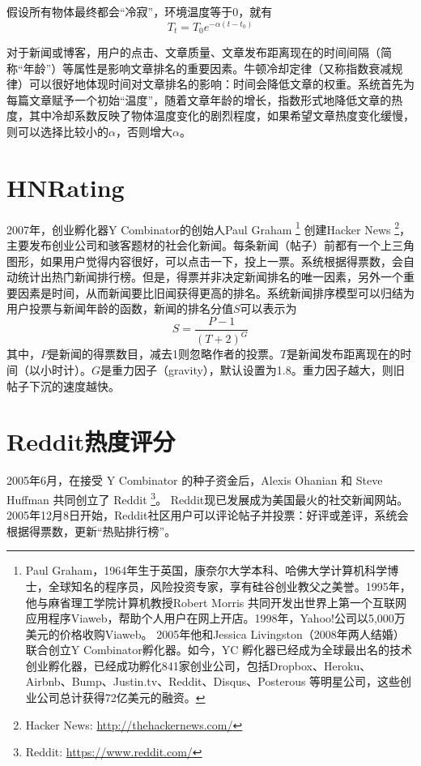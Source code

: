 假设所有物体最终都会“冷寂”，环境温度等于0，就有
\begin{equation}
    T_t = T_0 e^{-\alpha(t-t_0)}
\end{equation}

对于新闻或博客，用户的点击、文章质量、文章发布距离现在的时间间隔（简称“年龄”）等属性是影响文章排名的重要因素。牛顿冷却定律（又称指数衰减规律）可以很好地体现时间对文章排名的影响：时间会降低文章的权重。系统首先为每篇文章赋予一个初始“温度”，随着文章年龄的增长，指数形式地降低文章的热度，其中冷却系数反映了物体温度变化的剧烈程度，如果希望文章热度变化缓慢，则可以选择比较小的$\alpha$，否则增大$\alpha$。

\section{HNRating}
2007年，创业孵化器Y Combinator的创始人Paul Graham
\footnote{Paul Graham，1964年生于英国，康奈尔大学本科、哈佛大学计算机科学博士，全球知名的程序员，风险投资专家，享有硅谷创业教父之美誉。1995年，他与麻省理工学院计算机教授Robert Morris 共同开发出世界上第一个互联网应用程序Viaweb，帮助个人用户在网上开店。1998年，Yahoo!公司以5,000万美元的价格收购Viaweb。
2005年他和Jessica Livingston（2008年两人结婚）联合创立Y Combinator孵化器。如今，YC 孵化器已经成为全球最出名的技术创业孵化器，已经成功孵化841家创业公司，包括Dropbox、Heroku、Airbnb、Bump、Justin.tv、Reddit、Disqus、Posterous 等明星公司，这些创业公司总计获得72亿美元的融资。}
创建Hacker News
\footnote{Hacker News: \href{http://thehackernews.com/}{http://thehackernews.com/}}，
主要发布创业公司和骇客题材的社会化新闻。每条新闻（帖子）前都有一个上三角图形，如果用户觉得内容很好，可以点击一下，投上一票。系统根据得票数，会自动统计出热门新闻排行榜。但是，得票并非决定新闻排名的唯一因素，另外一个重要因素是时间，从而新闻要比旧闻获得更高的排名。系统新闻排序模型可以归结为用户投票与新闻年龄的函数，新闻的排名分值$S$可以表示为
\begin{equation}
   S = \frac{P-1}{(T+2)^G}
\end{equation}
其中，$P$是新闻的得票数目，减去1则忽略作者的投票。$T$是新闻发布距离现在的时间（以小时计）。$G$是重力因子（gravity），默认设置为1.8。重力因子越大，则旧帖子下沉的速度越快。

\section{Reddit热度评分}%
2005年6月，在接受 Y Combinator 的种子资金后，Alexis Ohanian 和 Steve Huffman 共同创立了 Reddit
\footnote{Reddit: \href{https://www.reddit.com/}{https://www.reddit.com/}}。
Reddit现已发展成为美国最火的社交新闻网站。2005年12月8日开始，Reddit社区用户可以评论帖子并投票：好评或差评，系统会根据得票数，更新“热贴排行榜”。

